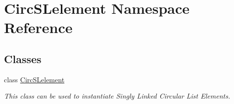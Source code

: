 \hypertarget{namespace_circ_s_lelement}{}\section{Circ\+S\+Lelement Namespace Reference}
\label{namespace_circ_s_lelement}
\subsection*{Classes}
\begin{DoxyCompactItemize}
\item 
class \hyperlink{class_circ_s_lelement_1_1_circ_s_lelement}{Circ\+S\+Lelement}
\begin{DoxyCompactList}\small\item\em This class can be used to instantiate Singly Linked Circular List Elements. \end{DoxyCompactList}\end{DoxyCompactItemize}
